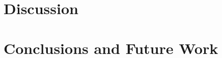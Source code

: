 \documentclass[11pt,a4paper]{ipmu}
\begin{document}
\chapter{Discussion}
\label{chap:discussion}
\minitoc 


\chapter{Conclusions and Future Work}
\label{chap:conclusions}




\backmatter


\end{document}
